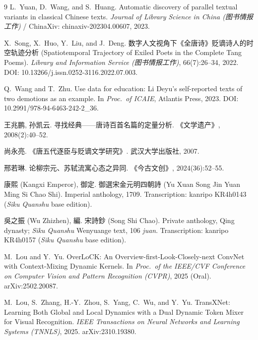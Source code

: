 \documentclass[10pt]{article}
\begin{document}
\begin{thebibliography}{9}
L.~Yuan, D.~Wang, and S.~Huang.
\newblock Automatic discovery of parallel textual variants in classical
Chinese texts.
\newblock \emph{Journal of Library Science in China (图书情报工作)} /
ChinaXiv: chinaxiv-202304.00607, 2023.

X.~Song, X.~Huo, Y.~Liu, and J.~Deng.
\newblock 数字人文视角下《全唐诗》贬谪诗人的时空轨迹分析 (Spatiotemporal
Trajectory of Exiled Poets in the Complete Tang Poems).
\newblock \emph{Library and Information Service (图书情报工作)}, 66(7):26--34,
2022. DOI: 10.13266/j.issn.0252-3116.2022.07.003.

Q.~Wang and T.~Zhu.
\newblock Use data for education: Li Deyu's self-reported texts of two
demotions as an example.
\newblock In \emph{Proc.\ of ICAIE}, Atlantis Press, 2023.
DOI: 10.2991/978-94-6463-242-2\_36.

王兆鹏, 孙凯云.
\newblock 寻找经典——唐诗百首名篇的定量分析.
\newblock 《文学遗产》, 2008(2):40--52.

尚永亮.
\newblock 《唐五代逐臣与贬谪文学研究》.
\newblock 武汉大学出版社, 2007.

邢若琳.
\newblock 论柳宗元、苏轼流寓心态之异同.
\newblock 《今古文创》, 2024(36):52--55.

康熙 (Kangxi Emperor), 御定.
\newblock 御選宋金元明四朝詩 (Yu Xuan Song Jin Yuan Ming Si Chao Shi).
\newblock Imperial anthology, 1709. Transcription: kanripo KR4h0143
(\emph{Siku Quanshu} base edition).

吳之振 (Wu Zhizhen), 編.
\newblock 宋詩鈔 (Song Shi Chao).
\newblock Private anthology, Qing dynasty; \emph{Siku Quanshu} Wenyuange text,
106 \emph{juan}. Transcription: kanripo KR4h0157 (\emph{Siku Quanshu} base
edition).

M.~Lou and Y.~Yu.
\newblock OverLoCK: An Overview-first-Look-Closely-next ConvNet with
Context-Mixing Dynamic Kernels.
\newblock In \emph{Proc.\ of the IEEE/CVF Conference on Computer Vision and
Pattern Recognition (CVPR)}, 2025 (Oral). arXiv:2502.20087.

M.~Lou, S.~Zhang, H.-Y.~Zhou, S.~Yang, C.~Wu, and Y.~Yu.
\newblock TransXNet: Learning Both Global and Local Dynamics with a Dual Dynamic
Token Mixer for Visual Recognition.
\newblock \emph{IEEE Transactions on Neural Networks and Learning Systems
(TNNLS)}, 2025. arXiv:2310.19380.


\end{thebibliography}
\end{document}
